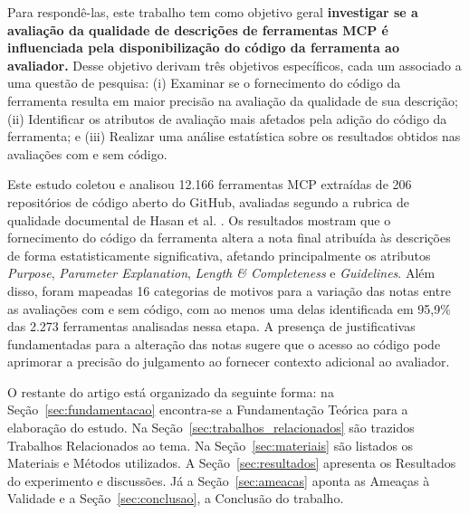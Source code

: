 Para respondê-las, este trabalho tem como objetivo geral \textbf{investigar se a avaliação da qualidade de descrições de ferramentas MCP é influenciada pela disponibilização do código da ferramenta ao avaliador.} Desse objetivo derivam três objetivos específicos, cada um associado a uma questão de pesquisa: (i) Examinar se o fornecimento do código da ferramenta resulta em maior precisão na avaliação da qualidade de sua descrição; (ii) Identificar os atributos de avaliação mais afetados pela adição do código da ferramenta; e (iii) Realizar uma análise estatística sobre os resultados obtidos nas avaliações com e sem código.

Este estudo coletou e analisou 12.166 ferramentas MCP extraídas de 206 repositórios de código aberto do GitHub, avaliadas segundo a rubrica de qualidade documental de Hasan et al. \cite{2026arXiv260214878M}. Os resultados mostram que o fornecimento do código da ferramenta altera a nota final atribuída às descrições de forma estatisticamente significativa, afetando principalmente os atributos \textit{Purpose}, \textit{Parameter Explanation}, \textit{Length \& Completeness} e \textit{Guidelines}. Além disso, foram mapeadas 16 categorias de motivos para a variação das notas entre as avaliações com e sem código, com ao menos uma delas identificada em 95,9\% das 2.273 ferramentas analisadas nessa etapa. A presença de justificativas fundamentadas para a alteração das notas sugere que o acesso ao código pode aprimorar a precisão do julgamento ao fornecer contexto adicional ao avaliador.

O restante do artigo está organizado da seguinte forma: na Seção~\ref{sec:fundamentacao} encontra-se a Fundamentação Teórica para a elaboração do estudo. Na Seção~\ref{sec:trabalhos_relacionados} são trazidos Trabalhos Relacionados ao tema. Na Seção~\ref{sec:materiais} são listados os Materiais e Métodos utilizados. A Seção~\ref{sec:resultados} apresenta os Resultados do experimento e discussões. Já a Seção~\ref{sec:ameacas} aponta as Ameaças à Validade e a Seção~\ref{sec:conclusao}, a Conclusão do trabalho.